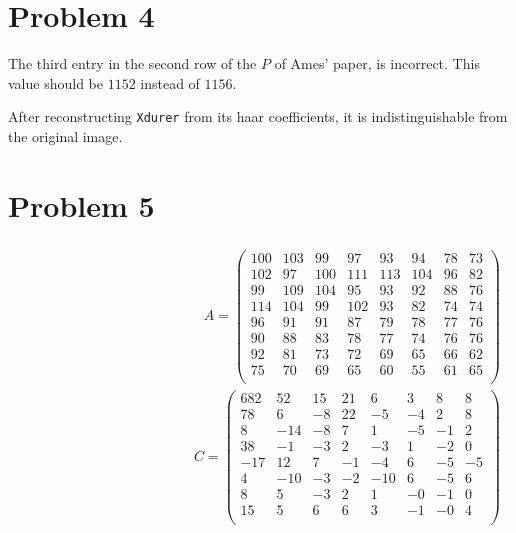 \documentclass[paper=a4, fontsize=11pt]{scrartcl} %
\begin{document}
\section*{Problem 4}
The third entry in the second row of the $P$ of Ames' paper, is incorrect.
This value should be $1152$ instead of $1156$.

\bigskip
After reconstructing \texttt{Xdurer} from its haar coefficients, it is
indistinguishable from the original image.

\section*{Problem 5}

\begin{align*}
    \begin{split}
        A =
        \begin{pmatrix}
            100 & 103 & 99  & 97  & 93  & 94  & 78 & 73\\
            102 & 97  & 100 & 111 & 113 & 104 & 96 & 82\\
            99  & 109 & 104 & 95  & 93  & 92  & 88 & 76\\
            114 & 104 & 99  & 102 & 93  & 82  & 74 & 74\\
            96  & 91  & 91  & 87  & 79  & 78  & 77 & 76\\
            90  & 88  & 83  & 78  & 77  & 74  & 76 & 76\\
            92  & 81  & 73  & 72  & 69  & 65  & 66 & 62\\
            75  & 70  & 69  & 65  & 60  & 55  & 61 & 65\\
        \end{pmatrix}
    \end{split}
    \begin{split}
        C =
        \begin{pmatrix}
            682 & 52  & 15  & 21  & 6   & 3   & 8   & 8\\
            78  & 6   & -8  & 22  & -5  & -4  & 2   & 8\\
            8   & -14 & -8  & 7   & 1   & -5  & -1  & 2\\
            38  & -1  & -3  & 2   & -3  & 1   & -2  & 0\\
            -17 & 12  & 7   & -1  & -4  & 6   & -5  & -5\\
            4   & -10 & -3  & -2  & -10 & 6   & -5  & 6\\
            8   & 5   & -3  & 2   & 1   & -0  & -1  & 0\\
            15  & 5   & 6   & 6   & 3   & -1  & -0  & 4\\
        \end{pmatrix}
    \end{split}
\end{align*}
\end{document}
